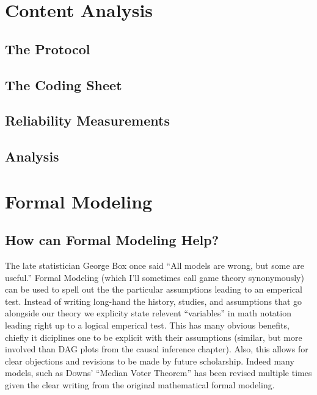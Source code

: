\documentclass[12pt]{article}\usepackage[]{graphicx}\usepackage[]{color}
\begin{document}
\begin{flushleft}
\section{Content Analysis}

\subsection{The Protocol}

\subsection{The Coding Sheet}

\subsection{Reliability Measurements}

\subsection{Analysis}




\clearpage
\section{Formal Modeling}

\subsection{How can Formal Modeling Help?} 

The late statistician George Box once said ``All models are wrong, but some are useful.'' Formal Modeling (which I'll sometimes call game theory synonymously) can be used to spell out the the particular assumptions leading to an emperical test. Instead of writing long-hand the history, studies, and assumptions that go alongside our theory we explicity state relevent ``variables'' in math notation leading right up to a logical emperical test. This has many obvious benefits, chiefly it diciplines one to be explicit with their assumptions (similar, but more involved than DAG plots from the causal inference chapter). Also, this allows for clear objections and revisions to be made by future scholarship. Indeed many models, such as Downs' ``Median Voter Theorem'' has been revised multiple times given the clear writing from the original mathematical formal modeling.


\end{flushleft}
\end{document}
